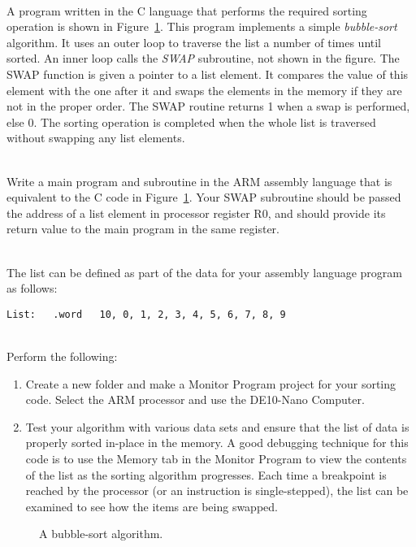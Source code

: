 \documentclass[epsfig,10pt,fullpage]{article}
\begin{document}
~\\
\noindent
A program written in the C language that performs the required sorting operation is shown in
Figure~\ref{fig:C_code}. This program implements a simple {\it bubble-sort} algorithm. It uses
an outer loop to traverse the list a number of times until sorted. An inner loop 
calls the {\it SWAP} subroutine, not shown in the figure. The SWAP function is given a
pointer to a list element. It compares the value of this element with the one after it
and swaps the elements in the memory if they are not in the proper order. The SWAP routine 
returns 1 when a swap is performed, else 0. The sorting operation is completed when the
whole list is traversed without swapping any list elements. 

~\\
\noindent
Write a main program and subroutine in the ARM assembly language that is equivalent to the C code 
in Figure~\ref{fig:C_code}. Your SWAP subroutine should be passed the address of a list element 
in processor register R0, and should provide its return value to the main program in the same 
register.  

~\\
\noindent
The list can be defined as part of the data for your assembly language program as follows:

\begin{lstlisting}[style=defaultArmStyle]
List: 	.word 	10, 0, 1, 2, 3, 4, 5, 6, 7, 8, 9
\end{lstlisting}

~\\
\noindent
Perform the following:

\begin{enumerate}
\item Create a new folder and make a Monitor Program project for your sorting code. Select
the ARM processor and use the DE10-Nano Computer.

\item
Test your algorithm with various data sets and ensure
that the list of data is properly sorted in-place in the memory. A good debugging
technique for this code is to use the Memory tab in the Monitor Program to view the
contents of the list as the sorting algorithm progresses. Each time a breakpoint is reached by
the processor (or an instruction is single-stepped), the list can be examined to see how
the items are being swapped.
\end{enumerate}

\begin{figure}[H]
\begin{center}

\end{center}
\caption{A bubble-sort algorithm.}
\label{fig:C_code}
\end{figure}
\end{document}
